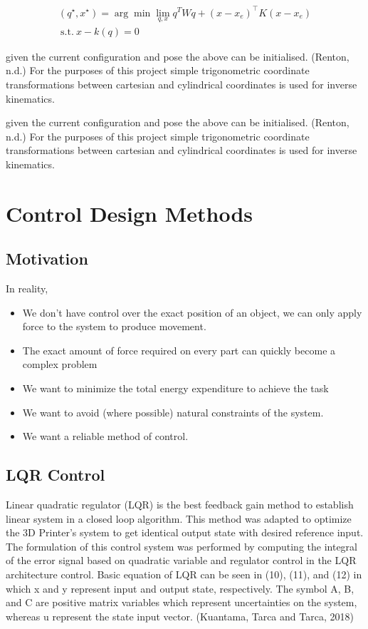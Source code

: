 \documentclass{UoNMCHA}
\numberwithin{equation}{section}
\begin{document}
\begin{gather*}
	\left(q^\star,x^\star\right)=\arg{\min \lim_{q,x}{q^{T}W}q}+\left(x-x_e\right)^\top K\left(x-x_e\right) \\
	\mathrm{\ s.t.\ }x-k\left(q\right)=0
\end{gather*}

given the current configuration and pose the above can be initialised. (Renton, n.d.)
For the purposes of this project simple trigonometric coordinate transformations between cartesian and cylindrical coordinates is used for inverse kinematics.


given the current configuration and pose the above can be initialised. (Renton, n.d.)
For the purposes of this project simple trigonometric coordinate transformations between cartesian and cylindrical coordinates is used for inverse kinematics.


\section{Control Design Methods}

\subsection{Motivation}

In reality,
\begin{itemize}
\item We don’t have control over the exact position of an object, we can only apply force to the system to produce movement. 
\item The exact amount of force required on every part can quickly become a complex problem 
\item We want to minimize the total energy expenditure to achieve the task 
\item We want to avoid (where possible) natural constraints of the system. 
\item We want a reliable method of control. 	
\end{itemize}


\subsection{LQR Control}

Linear quadratic regulator (LQR) is the best feedback gain method to establish linear system in a closed loop algorithm. This method was adapted to optimize the 3D Printer’s system to get identical output state with desired reference input. The formulation of this control system was performed by computing the integral of the error signal based on quadratic variable and regulator control in the LQR architecture control. Basic equation of LQR can be seen in (10), (11), and (12) in which x and y represent input and output state, respectively. The symbol A, B, and C are positive matrix variables which represent uncertainties on the system, whereas u represent the state input vector. (Kuantama, Tarca and Tarca, 2018)
\end{document}
